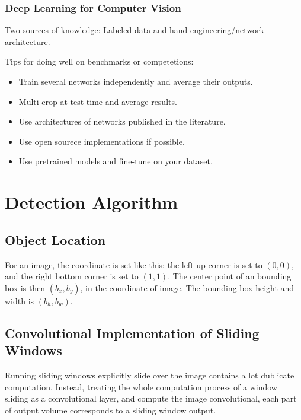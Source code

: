 \documentclass{article}
\begin{document}
		\subsubsection{Deep Learning for Computer Vision}
			\begin{flushleft}
				Two sources of knowledge: Labeled data and hand engineering/network architecture.
			\end{flushleft}
			\begin{flushleft}
				Tips for doing well on benchmarks or competetions:
				\begin{itemize}
					\item Train several networks independently and average their outputs.
					\item Multi-crop at test time and average results.
					\item Use architectures of networks published in the literature.
					\item Use open sourece implementations if possible.
					\item Use pretrained models and fine-tune on your dataset.
				\end{itemize}
			\end{flushleft}

\section{Detection Algorithm}
	\subsection{Object Location}
		\begin{flushleft}
			For an image, the coordinate is set like this: the left up corner is set to $(0,0)$, and the right bottom corner is set to $(1,1)$. The center point of an bounding box is then $(b_x,b_y)$, in the coordinate of image. The bounding box height and width is $(b_h,b_w)$.
		\end{flushleft}
	\subsection{Convolutional Implementation of Sliding Windows}
		\begin{flushleft}
			Running sliding windows explicitly slide over the image contains a lot dublicate computation. Instead, treating the whole computation process of a window sliding as a convolutional layer, and compute the image convolutional, each part of output volume corresponds to a sliding window output.
		\end{flushleft}
\end{document}
